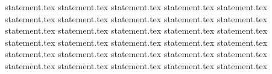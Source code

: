 {statement.tex}
{statement.tex}
{statement.tex}
{statement.tex}
{statement.tex}
{statement.tex}
{statement.tex}
{statement.tex}
{statement.tex}
{statement.tex}
{statement.tex}
{statement.tex}
{statement.tex}
{statement.tex}
{statement.tex}
{statement.tex}
{statement.tex}
{statement.tex}
{statement.tex}
{statement.tex}
{statement.tex}
{statement.tex}
{statement.tex}
{statement.tex}
{statement.tex}
{statement.tex}
{statement.tex}
{statement.tex}
{statement.tex}
{statement.tex}